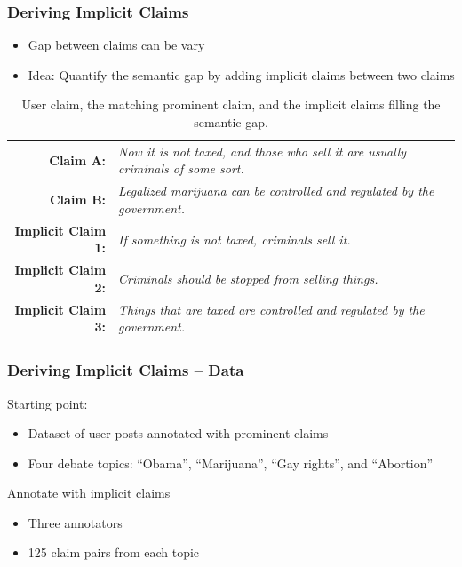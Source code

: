 \documentclass{beamer}
\begin{document}
\begin{frame}
	\frametitle{Deriving Implicit Claims}

	\begin{itemize}
		\item Gap between claims can be vary
		\item Idea: Quantify the semantic gap by adding implicit claims between two claims
	\end{itemize}

\begin{table}
{\scriptsize
\begin{tabular}{|@{\ }r@{\ \  }p{}|}
\hline
\textbf{Claim A:} & \emph{Now it is not taxed, and those who sell it are
	usually criminals of some sort.}\\
\textbf{Claim B:} & \emph{Legalized marijuana can be controlled and
	regulated by the government.}\\
\textbf{Implicit Claim 1:} & \emph{If something is not taxed, criminals sell
	it.}\\
\textbf{Implicit Claim 2:} & \emph{Criminals should be stopped from selling
	things.}\\
\textbf{Implicit Claim 3:} & \emph{Things that are taxed are controlled and
	regulated by the government.}\\
\hline
\end{tabular}}
\caption{User claim, the matching prominent claim, and the implicit claims filling the semantic gap.}
\label{tab:premise_example}
\end{table}
\end{frame}

\begin{frame}
	\frametitle{Deriving Implicit Claims -- Data}
	Starting point:
	\begin{itemize}
		\item  Dataset of user posts annotated with prominent claims \cite{hasan2014you}
		\item Four debate topics:  ``Obama'', ``Marijuana'', ``Gay rights'', and ``Abortion'' 
	\end{itemize}
	Annotate with implicit claims
	\begin{itemize}
		\item Three annotators
		\item 125 claim pairs from each topic
	\end{itemize}

\end{frame}
\end{document}
